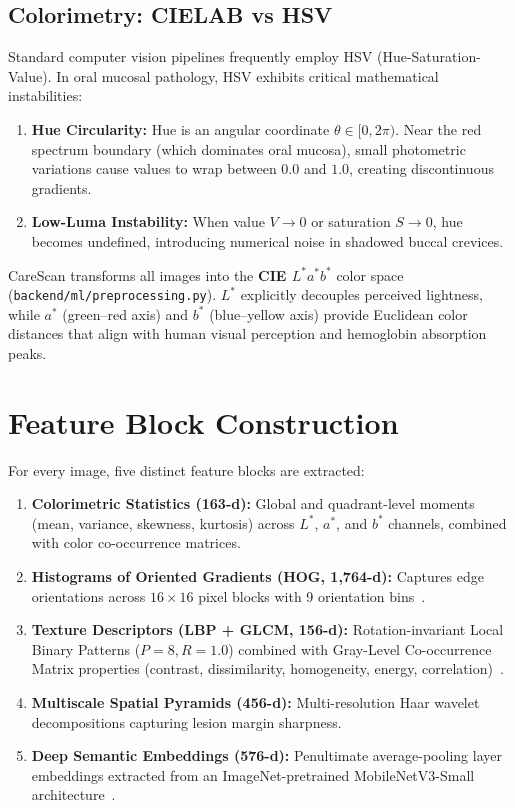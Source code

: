 \documentclass[11pt,a4paper]{report}
\newcommand{\artifact}[1]{\texttt{\footnotesize #1}}
\begin{document}
\subsection{Colorimetry: CIELAB vs HSV}
Standard computer vision pipelines frequently employ HSV (Hue-Saturation-Value). In oral mucosal pathology, HSV exhibits critical mathematical instabilities:
\begin{enumerate}
  \item \textbf{Hue Circularity:} Hue is an angular coordinate $\theta \in [0, 2\pi)$. Near the red spectrum boundary (which dominates oral mucosa), small photometric variations cause values to wrap between $0.0$ and $1.0$, creating discontinuous gradients.
  \item \textbf{Low-Luma Instability:} When value $V \to 0$ or saturation $S \to 0$, hue becomes undefined, introducing numerical noise in shadowed buccal crevices.
\end{enumerate}
CareScan transforms all images into the \textbf{CIE $L^*a^*b^*$} color space (\artifact{backend/ml/preprocessing.py}). $L^*$ explicitly decouples perceived lightness, while $a^*$ (green--red axis) and $b^*$ (blue--yellow axis) provide Euclidean color distances that align with human visual perception and hemoglobin absorption peaks.

\section{Feature Block Construction}
For every image, five distinct feature blocks are extracted:
\begin{enumerate}
  \item \textbf{Colorimetric Statistics (163-d):} Global and quadrant-level moments (mean, variance, skewness, kurtosis) across $L^*$, $a^*$, and $b^*$ channels, combined with color co-occurrence matrices.
  \item \textbf{Histograms of Oriented Gradients (HOG, 1,764-d):} Captures edge orientations across $16 \times 16$ pixel blocks with 9 orientation bins~\cite{dalal2005histograms}.
  \item \textbf{Texture Descriptors (LBP + GLCM, 156-d):} Rotation-invariant Local Binary Patterns ($P=8, R=1.0$) combined with Gray-Level Co-occurrence Matrix properties (contrast, dissimilarity, homogeneity, energy, correlation)~\cite{ojala2002multiresolution}.
  \item \textbf{Multiscale Spatial Pyramids (456-d):} Multi-resolution Haar wavelet decompositions capturing lesion margin sharpness.
  \item \textbf{Deep Semantic Embeddings (576-d):} Penultimate average-pooling layer embeddings extracted from an ImageNet-pretrained MobileNetV3-Small architecture~\cite{howard2019searching}.
\end{enumerate}
\end{document}
